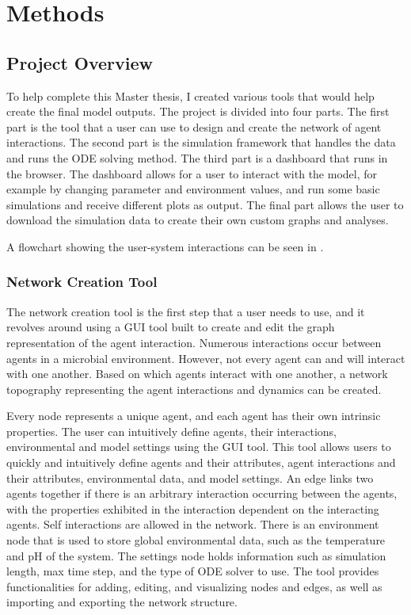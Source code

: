 \chapter{Methods}
\label{Methods}
\section{Project Overview}
To help complete this Master thesis, I created various tools that would help create the final model outputs.
The project is divided into four parts. 
The first part is the tool that a user can use to design and create the network of agent interactions. 
The second part is the simulation framework that handles the data and runs the ODE solving method. 
The third part is a dashboard that runs in the browser. The dashboard allows for a user to interact with the model, for example by changing parameter and environment values, and run some basic simulations and receive different plots as output. 
The final part allows the user to download the simulation data to create their own custom graphs and analyses. 

A flowchart showing the user-system interactions can be seen in . 

\subsection{Network Creation Tool}
\label{sec:network_creation_tool}
The network creation tool is the first step that a user needs to use, and it revolves around using a GUI tool built to create and edit the graph representation of the agent interaction.
Numerous interactions occur between agents in a microbial environment.
However, not every agent can and will interact with one another.
Based on which agents interact with one another, a network topography representing the agent interactions and dynamics can be created. 

Every node represents a unique agent, and each agent has their own intrinsic properties. 
The user can intuitively define agents, their interactions, environmental and model settings using the GUI tool. 
This tool allows users to quickly and intuitively define agents and their attributes, agent interactions and their attributes, environmental data, and model settings.
An edge links two agents together if there is an arbitrary interaction occurring between the agents, with the properties exhibited in the interaction dependent on the interacting agents. 
Self interactions are allowed in the network. 
There is an environment node that is used to store global environmental data, such as the temperature and pH of the system.
The settings node holds information such as simulation length, max time step, and the type of ODE solver to use.
The tool provides functionalities for adding, editing, and visualizing nodes and edges, as well as importing and exporting the network structure.  

